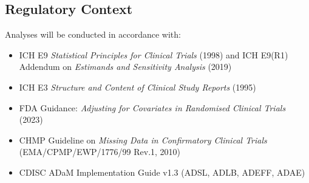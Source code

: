 \subsection{Regulatory Context}

Analyses will be conducted in accordance with:
\begin{itemize}[leftmargin=1.6em, itemsep=2pt]
  \item ICH E9 \textit{Statistical Principles for Clinical Trials} (1998) and
        ICH E9(R1) Addendum on \textit{Estimands and Sensitivity Analysis} (2019)
  \item ICH E3 \textit{Structure and Content of Clinical Study Reports} (1995)
  \item FDA Guidance: \textit{Adjusting for Covariates in Randomised Clinical Trials}
        (2023)
  \item CHMP Guideline on \textit{Missing Data in Confirmatory Clinical Trials}
        (EMA/CPMP/EWP/1776/99 Rev.1, 2010)
  \item CDISC ADaM Implementation Guide v1.3 (ADSL, ADLB, ADEFF, ADAE)
\end{itemize}

\clearpage


